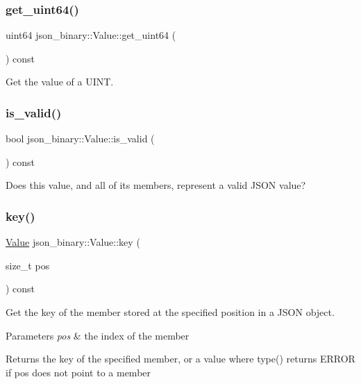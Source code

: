\subsubsection{\texorpdfstring{get\+\_\+uint64()}{get\_uint64()}}
{\footnotesize\ttfamily uint64 json\+\_\+binary\+::\+Value\+::get\+\_\+uint64 (\begin{DoxyParamCaption}{ }\end{DoxyParamCaption}) const}

Get the value of a U\+I\+NT. \mbox{\label{classjson__binary_1_1Value_af156297a9b0f2584f5986e899bf12c6c}} 
\subsubsection{\texorpdfstring{is\+\_\+valid()}{is\_valid()}}
{\footnotesize\ttfamily bool json\+\_\+binary\+::\+Value\+::is\+\_\+valid (\begin{DoxyParamCaption}{ }\end{DoxyParamCaption}) const}

Does this value, and all of its members, represent a valid J\+S\+ON value? \mbox{\label{classjson__binary_1_1Value_a10443a279b53069820d5f0c426a046db}} 
\subsubsection{\texorpdfstring{key()}{key()}}
{\footnotesize\ttfamily \mbox{\hyperlink{classjson__binary_1_1Value}{Value}} json\+\_\+binary\+::\+Value\+::key (\begin{DoxyParamCaption}\item[{size\+\_\+t}]{pos }\end{DoxyParamCaption}) const}

Get the key of the member stored at the specified position in a J\+S\+ON object.


\begin{DoxyParams}{Parameters}
{\em pos} & the index of the member \\
\hline
\end{DoxyParams}
\begin{DoxyReturn}{Returns}
the key of the specified member, or a value where type() returns E\+R\+R\+OR if pos does not point to a member 
\end{DoxyReturn}
\mbox{\label{classjson__binary_1_1Value_a5bfd3f9c95980a2565ea9bcf35392c03}} 
